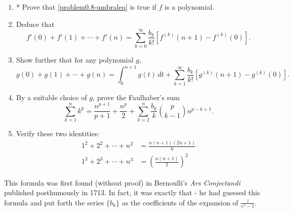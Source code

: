 \documentclass[../main.tex]{subfiles}
\begin{document}
\begin{enumerate}
    \item* Prove that \eqref{problem0.8-umbraleq} is true if $f$ is a polynomial.
    \item Deduce that $$f'(0)+f'(1)+\cdots+f'(n)=\sum_{k=0}^{\infty}\frac{b_k}{k!} [f^{(k)}(n+1)-f^{(k)}(0)].$$
    \item Show further that for any polynomial $g$, 
    $$g(0)+g(1)+\cdots+g(n)=\int_{0}^{n+1}g(t)\,dt+\sum_{k=1}^{\infty}\frac{b_k}{k!} [g^{(k)}(n+1)-g^{(k)}(0)].$$
    \item By a suitable choice of $g$, prove the Faulhaber's sum
    $$\sum_{k=1}^n k^p=\frac{n^{p+1}}{p+1}+\frac{n^p}{2}+\sum_{k=2}^n\frac{b_k}{k}\binom{p}{k-1}n^{p-k+1}.$$
    \item Verify these two identities:
    \begin{align*}
        1^2+2^2+\cdots+n^2&=\frac{n(n+1)(2n+1)}{6} \\
        1^3+2^3+\cdots+n^3&=\left(\frac{n(n+1)}{2}\right)^2
    \end{align*}
\end{enumerate}
\begin{remark}
This formula was first found (without proof) in Bernoulli's \textit{Ars Conjectandi} published posthumously in 1713. In fact, it was exactly that - he had guessed this formula and put forth the series $\{b_k\}$ as the coefficients of the expansion of $\frac{z}{e^z-1}$.
\end{remark}
\end{document}
